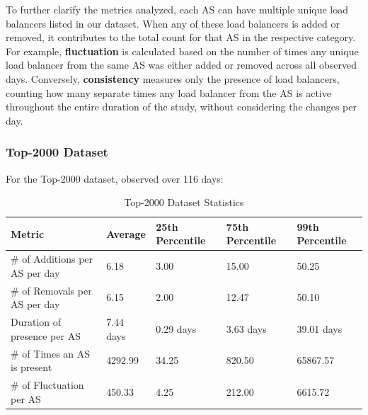 \documentclass[12pt]{cwru_thesis}
\begin{document}
To further clarify the metrics analyzed, each AS can have multiple unique load balancers listed in our dataset. When any of these load balancers is added or removed, it contributes to the total count for that AS in the respective category. For example, \textbf{fluctuation} is calculated based on the number of times any unique load balancer from the same AS was either added or removed across all observed days. Conversely, \textbf{consistency} measures only the presence of load balancers, counting how many separate times any load balancer from the AS is active throughout the entire duration of the study, without considering the changes per day.



\subsubsection{Top-2000 Dataset}

For the Top-2000 dataset, observed over 116 days:

\begin{table}[h!]
    \centering
    \begin{tabular}{|l|l|l|l|l|}
        \hline
        \textbf{Metric} & \textbf{Average} & \textbf{25th Percentile} & \textbf{75th Percentile} & \textbf{99th Percentile} \\
        \hline
        \# of Additions per AS per day & 6.18 & 3.00 & 15.00 & 50.25 \\
        \hline
        \# of Removals per AS per day & 6.15 & 2.00 & 12.47 & 50.10 \\
        \hline
        Duration of presence per AS & 7.44 days & 0.29 days & 3.63 days & 39.01 days \\
        \hline
        \# of Times an AS is present & 4292.99 & 34.25 & 820.50 & 65867.57 \\
        \hline
        \# of Fluctuation per AS & 450.33 & 4.25 & 212.00 & 6615.72 \\
        \hline
    \end{tabular}
    \caption{Top-2000 Dataset Statistics}
    \label{tab:top-2000-stats}
\end{table}
\end{document}
